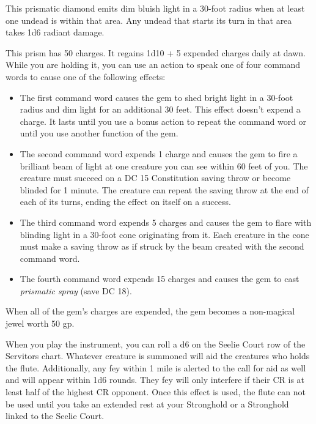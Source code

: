 \documentclass[letter,10pt,twocolumn,openany]{dndbook}
\begin{document}



This prismatic diamond emits dim bluish light in a 30-foot radius when at least one undead is within that area. Any undead that starts its turn in that area takes 1d6 radiant damage.

This prism has 50 charges. It regains 1d10 + 5 expended charges daily at dawn. While you are holding it, you can use an action to speak one of four command words to cause one of the following effects:


\begin{itemize}
    \item The first command word causes the gem to shed bright light in a 30-foot radius and dim light for an additional 30 feet.
          This effect doesn't expend a charge.
          It lasts until you use a bonus action to repeat the command word or until you use another function of the gem.
    \item The second command word expends 1 charge and causes the gem to fire a brilliant beam of light at one creature you can see within 60 feet of you.
          The creature must succeed on a DC 15 Constitution saving throw or become blinded for 1 minute.
          The creature can repeat the saving throw at the end of each of its turns, ending the effect on itself on a success.
    \item The third command word expends 5 charges and causes the gem to flare with blinding light in a 30-foot cone originating from it.
          Each creature in the cone must make a saving throw as if struck by the beam created with the second command word.
    \item The fourth command word expends 15 charges and causes the gem to cast \textit{prismatic spray} (save DC 18).
\end{itemize}

When all of the gem's charges are expended, the gem becomes a non-magical jewel worth 50 gp.



When you play the instrument, you can roll a d6 on the Seelie Court row of the Servitors chart.
Whatever creature is summoned will aid the creatures who holds the flute.
Additionally, any fey within 1 mile is alerted to the call for aid as well and will appear within 1d6 rounds.
They fey will only interfere if their CR is at least half of the highest CR opponent.
Once this effect is used, the flute can not be used until you take an extended rest at your Stronghold or a Stronghold linked to the Seelie Court.
\end{document}

